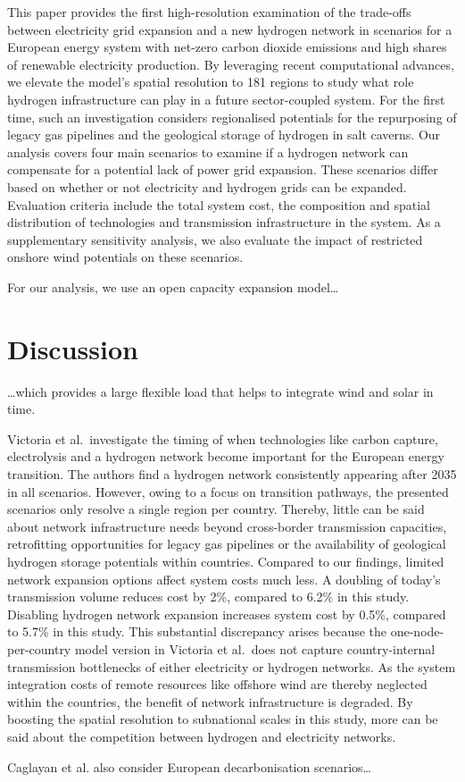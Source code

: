 \documentclass{article}
\begin{document}
This paper provides the first high-resolution examination of the trade-offs
between electricity grid expansion and a new hydrogen network in scenarios for a
European energy system with net-zero carbon dioxide emissions and high shares of
renewable electricity production. By leveraging recent computational advances,
we elevate the model's spatial resolution to 181 regions to study what role
hydrogen infrastructure can play in a future sector-coupled system. For the
first time, such an investigation considers regionalised potentials for the
repurposing of legacy gas pipelines and the geological storage of hydrogen in
salt caverns. Our analysis covers four main scenarios to examine if a hydrogen
network can compensate for a potential lack of power grid expansion. These
scenarios differ based on whether or not electricity and hydrogen grids can be
expanded. Evaluation criteria include the total system cost, the composition and
spatial distribution of technologies and transmission infrastructure in the
system. As a supplementary sensitivity analysis, we also evaluate the impact of
restricted onshore wind potentials on these scenarios.

For our analysis, we use an open capacity expansion model\dots

\section*{Discussion}

\dots which provides a large flexible load that helps to integrate wind and
solar in time.

Victoria et al.~investigate the timing of
when technologies like carbon capture, electrolysis and a hydrogen network
become important for the European energy transition. The authors find a hydrogen
network consistently appearing after 2035 in all scenarios. However, owing to a
focus on transition pathways, the presented scenarios only resolve a single
region per country. Thereby, little can be said about network infrastructure
needs beyond cross-border transmission capacities, retrofitting opportunities
for legacy gas pipelines or the availability of geological hydrogen storage
potentials within countries. Compared to our findings, limited network expansion
options affect system costs much less. A doubling of today's transmission volume
reduces cost by 2\%, compared to 6.2\% in this study. Disabling hydrogen network
expansion increases system cost by 0.5\%, compared to 5.7\% in this study. This
substantial discrepancy arises because the one-node-per-country model version in
Victoria et al.~does not capture
country-internal transmission bottlenecks of either electricity or hydrogen
networks. As the system integration costs of remote resources like offshore wind
are thereby neglected within the countries, the benefit of network
infrastructure is degraded. By boosting the spatial resolution to subnational
scales in this study, more can be said about the competition between hydrogen
and electricity networks.

Caglayan et al. also consider European decarbonisation
scenarios\dots
\end{document}
